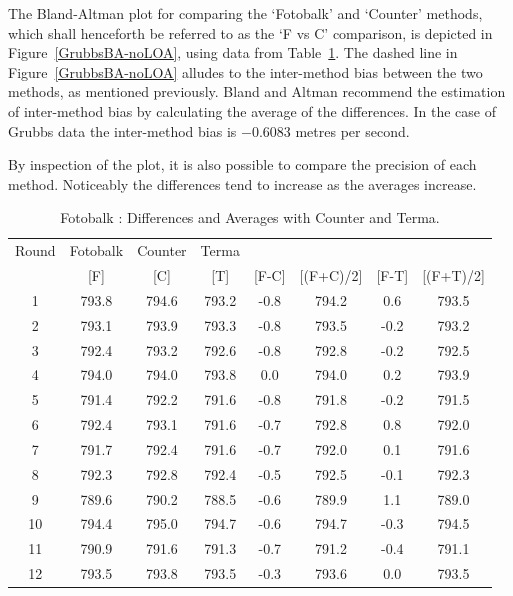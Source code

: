 \documentclass[12pt, a4paper]{report}
\theoremstyle{plain}
\theoremstyle{definition}
\theoremstyle{remark}
\begin{document}

	
The Bland-Altman plot for comparing the `Fotobalk' and `Counter' methods, which shall henceforth be referred to as the `F vs C' comparison, is depicted in Figure~\ref{GrubbsBA-noLOA}, using data from Table~\ref{GrubbsData1}. The dashed line in Figure~\ref{GrubbsBA-noLOA} alludes to the inter-method bias between the two methods, as mentioned previously. Bland and Altman recommend the estimation of inter-method bias by calculating the	average of the differences. In the case of Grubbs data the inter-method bias is $-0.6083$ metres per second.

	

By inspection of the plot, it is also possible to compare the precision of each method. Noticeably the differences tend to increase as the averages increase.
		
	
	\begin{table}[h!]
		\renewcommand\arraystretch{0.7}%
		\begin{center}
			\begin{tabular}{|c||c|c|c||c|c|c|c|}
				\hline
				Round & Fotobalk  & Counter & Terma  &   &    &   &   \\
				&  [F] & [C] & [T] &[F-C] &  [(F+C)/2] & [F-T] &  [(F+T)/2] \\
				\hline
				1 & 793.8 & 794.6 & 793.2 & -0.8 & 794.2 & 0.6 & 793.5 \\
				2 & 793.1 & 793.9 & 793.3 & -0.8 & 793.5 & -0.2 & 793.2 \\
				3 & 792.4 & 793.2 & 792.6 & -0.8 & 792.8 & -0.2 & 792.5 \\
				4 & 794.0 & 794.0 & 793.8 & 0.0 & 794.0 & 0.2 & 793.9 \\
				5 & 791.4 & 792.2 & 791.6 & -0.8 & 791.8 & -0.2 & 791.5 \\
				6 & 792.4 & 793.1 & 791.6 & -0.7 & 792.8 & 0.8 & 792.0 \\
				7 & 791.7 & 792.4 & 791.6 & -0.7 & 792.0 & 0.1 & 791.6 \\
				8 & 792.3 & 792.8 & 792.4 & -0.5 & 792.5 & -0.1 & 792.3 \\
				9 & 789.6 & 790.2 & 788.5 & -0.6 & 789.9 & 1.1 & 789.0 \\
				10 & 794.4 & 795.0 & 794.7 & -0.6 & 794.7 & -0.3 & 794.5 \\
				11 & 790.9 & 791.6 & 791.3 & -0.7 & 791.2 & -0.4 & 791.1 \\
				12 & 793.5 & 793.8 & 793.5 & -0.3 & 793.6 & 0.0 & 793.5 \\
				\hline
			\end{tabular}
			\caption{Fotobalk : Differences and Averages with Counter and Terma.}
		\label{GrubbsData1}
		\end{center}
	\end{table}
	
\end{document}
